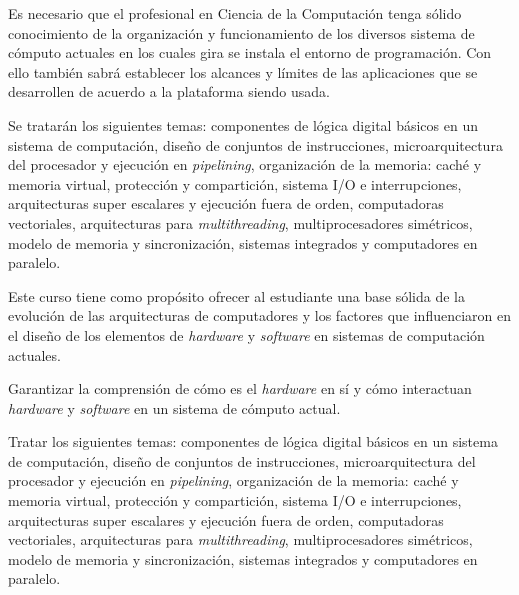 \begin{syllabus}


\begin{justification}
Es necesario que el profesional en Ciencia de la Computación tenga sólido  conocimiento de la organización y funcionamiento de los diversos sistema de cómputo actuales en los cuales gira se instala el entorno de programación. Con ello también sabrá establecer los alcances y límites de las aplicaciones que se desarrollen de acuerdo a la plataforma siendo usada.

Se tratarán los siguientes temas: componentes de lógica digital básicos en un sistema de computación, diseño de conjuntos de instrucciones, microarquitectura del procesador y ejecución en \textit{pipelining}, organización de la memoria: caché y memoria virtual, protección y compartición, sistema I/O e interrupciones, arquitecturas super escalares y ejecución fuera de orden, computadoras vectoriales, arquitecturas para \textit{multithreading}, multiprocesadores simétricos, modelo de memoria y sincronización, sistemas integrados y computadores en paralelo.

\end{justification}

\begin{goals}
\item Este curso tiene como propósito ofrecer al estudiante una base sólida de la evolución de las arquitecturas de computadores y los factores que influenciaron en el diseño de los elementos de \textit{hardware} y \textit{software} en sistemas de computación actuales. 
\item Garantizar la comprensión de cómo es el \textit{hardware} en sí y cómo interactuan \textit{hardware} y \textit{software} en un sistema de cómputo actual.
\item Tratar los siguientes temas: componentes de lógica digital básicos en un sistema de computación, diseño de conjuntos de instrucciones, microarquitectura del procesador y ejecución en \textit{pipelining}, organización de la memoria: caché y memoria virtual, protección y compartición, sistema I/O e interrupciones, arquitecturas super escalares y ejecución fuera de orden, computadoras vectoriales, arquitecturas para \textit{multithreading}, multiprocesadores simétricos, modelo de memoria y sincronización, sistemas integrados y computadores en paralelo.
\end{goals}


\end{syllabus}
